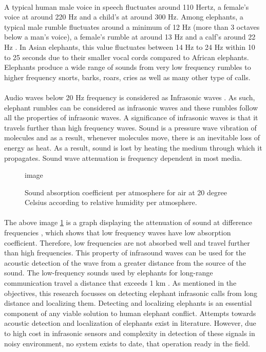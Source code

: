 \documentclass[11pt]{article}
\numberwithin{figure}{section}
\numberwithin{table}{section}
\begin{document}
\paragraph{}
A typical human male voice in speech fluctuates around 110 Hertz, a female's voice at around 220 Hz and a child's at around 300 Hz. Among elephants, a typical male rumble fluctuates around a minimum of 12 Hz (more than 3 octaves below a man's voice), a female's rumble at around 13 Hz and a calf's around 22 Hz \cite {1} \cite {2}. In Asian elephants, this value fluctuates between 14 Hz to 24 Hz within 10 to 25 seconds \cite {3} due to their smaller vocal cords compared to African elephants.  Elephants produce a wide range  of sounds from very low frequency rumbles to higher frequency snorts, barks, roars, cries as well as many other type of  calls. 

\paragraph{}
Audio waves below 20 Hz frequency is considered as Infrasonic waves \cite {4}. As such, elephant rumbles can be considered as infrasonic waves and these rumbles follow all the properties of infrasonic waves. A significance of infrasonic waves is that it travels further than high frequency waves. Sound is a pressure wave vibration of molecules and as a result, whenever molecules move, there is an inevitable loss of energy as heat. As a result, sound is lost by heating the medium through which it propagates. Sound wave attenuation is frequency dependent in most media.

\begin{figure}[h]
\centering
image
\caption{Sound absorption coefficient per atmosphere for air at 20 degree Celsius according to relative humidity per atmosphere.\cite{14}}
\label{fig:logo}
\end{figure}

\paragraph{}
The above image \ref{fig:logo} is a graph displaying the attenuation of sound at difference frequencies \cite {5}, which shows that low frequency waves have low absorption coefficient. Therefore, low frequencies are not absorbed well and travel further than high frequencies. This property of infrasound waves can be used  for the acoustic detection of the wave from a greater distance from the source of the sound. The low-frequency sounds used by elephants for long-range communication travel a distance that exceeds 1 km \cite {3}. As mentioned in the objectives, this research focusses on detecting elephant infrasonic calls from long distance and localizing them. Detecting and localizing elephants is an essential component of any viable solution to human elephant conflict. Attempts towards acoustic detection and localization of elephants exist in literature. However, due to high cost in infrasonic sensors and complexity in detection of these signals  in noisy environment, no system exists to date, that operation ready in the field.
\end{document}
